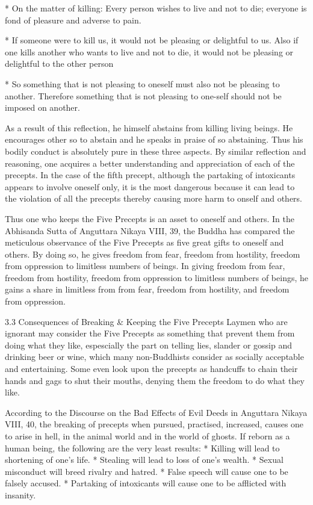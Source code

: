 * On the matter of killing: Every person wishes to live and not to die; everyone is fond of pleasure and adverse to pain.

* If someone were to kill us, it would not be pleasing or delightful to us. Also if one kills another who wants to live and not to die, it would not be pleasing or delightful to the other person

* So something that is not pleasing to oneself must also not be pleasing to another. Therefore something that is not pleasing to one-self should not be imposed on another.

As a result of this reflection, he himself abstains from killing living beings. He encourages other so to abstain and he speaks in praise of so abstaining. Thus his bodily conduct is absolutely pure in these three aspects. By similar reflection and reasoning, one acquires a better understanding and appreciation of each of the precepts. In the case of the fifth precept, although the partaking of intoxicants appears to involve oneself only, it is the most dangerous because it can lead to the violation of all the precepts thereby causing more harm to onself and others.

Thus one who keeps the Five Precepts is an asset to oneself and others. In the Abhisanda Sutta of Anguttara Nikaya VIII, 39, the Buddha has compared the meticulous observance of the Five Precepts as five great gifts to oneself and others. By doing so, he gives freedom from fear, freedom from hostility, freedom from oppression to limitless numbers of beings. In giving freedom from fear, freedom from hostility, freedom from oppression to limitless numbers of beings, he gains a share in limitless from from fear, freedom from hostility, and freedom from oppression.

3.3 Consequences of Breaking & Keeping the Five Precepts
Laymen who are ignorant may consider the Five Precepts as something that prevent them from doing what they like, espescially the part on telling lies, slander or gossip and drinking beer or wine, which many non-Buddhists consider as socially acceptable and entertaining. Some even look upon the precepts as handcuffs to chain their hands and gags to shut their mouths, denying them the freedom to do what they like.

According to the Discourse on the Bad Effects of Evil Deeds in Anguttara Nikaya VIII, 40, the breaking of precepts when pursued, practised, increased, causes one to arise in hell, in the animal world and in the world of ghosts. If reborn as a human being, the following are the very least results:
* Killing will lead to shortening of one's life.
* Stealing will lead to loss of one's wealth.
* Sexual misconduct will breed rivalry and hatred.
* False speech will cause one to be falsely accused.
* Partaking of intoxicants will cause one to be afflicted with insanity.

